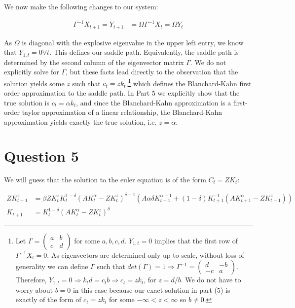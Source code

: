 \documentclass[11pt]{article} %
\begin{document}
We now make the following changes to our system:

\begin{align*}
\Gamma^{-1} X_{t+1} = Y_{t+1} &= \Omega\Gamma^{-1} X_{t} = \Omega Y_{t}
\end{align*}

As $\Omega$ is diagonal with the explosive eigenvalue in the upper left entry, we know that $Y_{1,t} = 0 \forall t$. This defines our saddle path. Equivalently, the saddle path is determined by the second column of the eigenvector matrix $\Gamma$. We do not explicitly solve for $\Gamma$, but these facts lead directly to the observation that the solution yields some $z$ such that $c_t = z k_t$,\footnote{Let $\Gamma = \begin{pmatrix} a & b\\ c  & d \end{pmatrix}$ for some $a,b,c,d.$ $Y_{1,t} = 0$ implies that the first row of $\Gamma^{-1}X_{t} = 0.$ As eigenvectors are determined only up to scale, without loss of generality we can define $\Gamma $ such that $det(\Gamma) = 1 \Rightarrow \Gamma^{-1} =  \begin{pmatrix} d & -b\\ -c  & a \end{pmatrix}$. Therefore, $Y_{1,t} = 0 \Rightarrow k_{t}d = c_tb \Rightarrow  c_t = zk_t$, for $z = d/b$. We do not have to worry about $b = 0$ in this case because our exact solution in part (5) is exactly of the form of $c_t = zk_t$ for some $-\infty<z<\infty$ so $b\neq 0.$ } which defines the Blanchard-Kahn first order approximation to the saddle path. In Part 5 we explicitly show that the true solution is $c_t = \alpha k_t$, and since the Blanchard-Kahn approximation is a first-order taylor approximation of a linear relationship, the Blanchard-Kahn approximation yields exactly the true solution, i.e. $z = \alpha.$

\section{Question 5}
We will guess that the solution to the euler equation is of the form $C_t = ZK_t$:

\begin{align*}
ZK_{t+1}^z&= \beta  ZK_t^{z} K_t^{1-\delta}(AK_t^{\alpha} -  ZK_t^{z})^{\delta - 1}(A\alpha \delta K_{t+1}^{\alpha - 1}  + (1-\delta)K_{t+1}^{-1}(AK_{t+1}^{\alpha} -  ZK_{t+1}^{z}) )\\
K_{t+1} &= K_t^{1-\delta}(AK_t^{\alpha} -  ZK_t^{z})^{\delta}
\end{align*}
\end{document}
